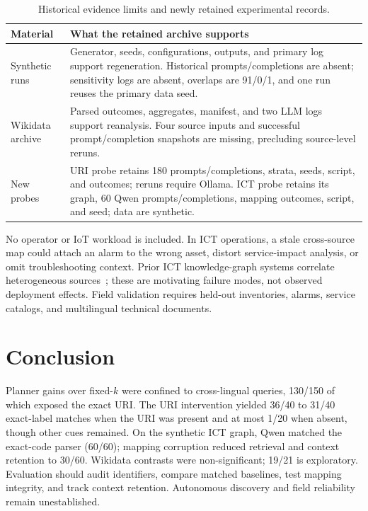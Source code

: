 \documentclass[a4paper,fleqn]{cas-dc}
\begin{document}
\begin{table}[t]
\centering\scriptsize
\begin{tabular}{>{\raggedright\arraybackslash}p{2.55cm}>{\raggedright\arraybackslash}p{12.15cm}}
\toprule
Material & What the retained archive supports \\
\midrule
Synthetic runs & Generator, seeds, configurations, outputs, and primary log support regeneration. Historical prompts/completions are absent; sensitivity logs are absent, overlaps are 91/0/1, and one run reuses the primary data seed. \\
Wikidata archive & Parsed outcomes, aggregates, manifest, and two LLM logs support reanalysis. Four source inputs and successful prompt/completion snapshots are missing, precluding source-level reruns. \\
New probes & URI probe retains 180 prompts/completions, strata, seeds, script, and outcomes; reruns require Ollama. ICT probe retains its graph, 60 Qwen prompts/completions, mapping outcomes, script, and seed; data are synthetic. \\
\bottomrule
\end{tabular}
\caption{Historical evidence limits and newly retained experimental records.}
\label{tab:availability}
\end{table}

No operator or IoT workload is included. In ICT operations, a stale cross-source map could attach an alarm to the wrong asset, distort service-impact analysis, or omit troubleshooting context. Prior ICT knowledge-graph systems correlate heterogeneous sources~\cite{xie2021iotkg,tailhardat2024noriaui}; these are motivating failure modes, not observed deployment effects. Field validation requires held-out inventories, alarms, service catalogs, and multilingual technical documents.

\section{Conclusion}\label{sec:conclusion}
Planner gains over fixed-$k$ were confined to cross-lingual queries, 130/150 of which exposed the exact URI. The URI intervention yielded 36/40 to 31/40 exact-label matches when the URI was present and at most 1/20 when absent, though other cues remained. On the synthetic ICT graph, Qwen matched the exact-code parser (60/60); mapping corruption reduced retrieval and context retention to 30/60. Wikidata contrasts were non-significant; 19/21 is exploratory. Evaluation should audit identifiers, compare matched baselines, test mapping integrity, and track context retention. Autonomous discovery and field reliability remain unestablished.
\end{document}
